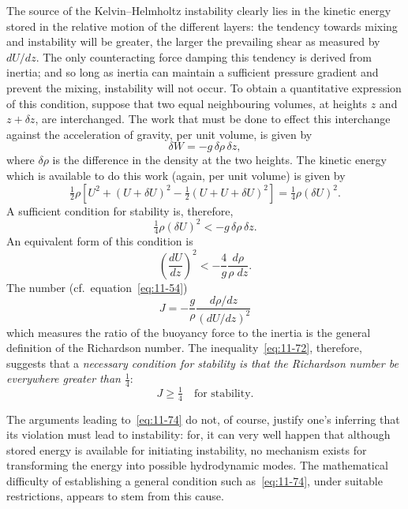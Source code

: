 The source of the Kelvin--Helmholtz instability clearly lies in the kinetic energy stored in the relative motion of the different layers: the tendency towards mixing and instability will be greater, the larger the prevailing shear as measured by $dU/dz$. The only counteracting force damping this tendency is derived from inertia; and so long as inertia can maintain a sufficient pressure gradient and prevent the mixing, instability will not occur. To obtain a quantitative expression of this condition, suppose that two equal neighbouring volumes, at heights $z$ and $z+\delta z$, are interchanged. The work that must be done to effect this interchange against the acceleration of gravity, per unit volume, is given by
\begin{equation}
\label{eq:11-69}
\delta W = -g\,\delta\rho\,\delta z,
\end{equation}
where $\delta\rho$ is the difference in the density at the two heights. The kinetic energy which is available to do this work (again, per unit volume) is given by
\begin{equation}
\label{eq:11-70}
\tfrac{1}{2}\rho\!\left[U^2+(U+\delta U)^2-\tfrac{1}{2}(U+U+\delta U)^2\right] = \tfrac{1}{4}\rho(\delta U)^2.
\end{equation}
A sufficient condition for stability is, therefore,
\begin{equation}
\label{eq:11-71}
\tfrac{1}{4}\rho(\delta U)^2 < -g\,\delta\rho\,\delta z.
\end{equation}
An equivalent form of this condition is
\begin{equation}
\label{eq:11-72}
\left(\frac{dU}{dz}\right)^{\!2} < -\frac{4}{g}\frac{d\rho}{\rho\;dz}.
\end{equation}
The number (cf.\ equation~\eqref{eq:11-54})
\begin{equation}
\label{eq:11-73}
J = -\frac{g}{\rho}\frac{d\rho/dz}{(dU/dz)^2}
\end{equation}
which measures the ratio of the buoyancy force to the inertia is the general definition of the Richardson number. The inequality~\eqref{eq:11-72}, therefore, suggests that a \textit{necessary condition for stability is that the Richardson number be everywhere greater than $\tfrac{1}{4}$}:
\begin{equation}
\label{eq:11-74}
J \geqslant \tfrac{1}{4} \quad\text{for stability.}
\end{equation}

The arguments leading to~\eqref{eq:11-74} do not, of course, justify one's inferring that its violation must lead to instability: for, it can very well happen that although stored energy is available for initiating instability, no mechanism exists for transforming the energy into possible hydrodynamic modes. The mathematical difficulty of establishing a general condition such as~\eqref{eq:11-74}, under suitable restrictions, appears to stem from this cause.

